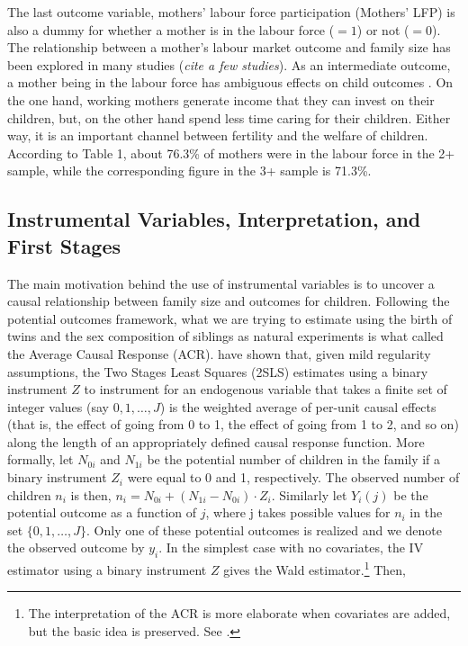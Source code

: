 The last outcome variable, mothers' labour force participation (Mothers' LFP) is also a dummy for whether a mother is in the labour force ($ =1 $) or not ($ =0 $). The relationship between a mother's labour market outcome and family size has been explored in many studies (\textit{cite a few studies}). As an intermediate outcome, a mother being in the labour force has ambiguous effects on child outcomes \parencite{caceres-delpiano_impacts_2006}. On the one hand, working mothers generate income that they can invest on their children, but, on the other hand spend less time caring for their children. Either way, it is an important channel between fertility and the welfare of children. According to Table 1, about 76.3\% of mothers were in the labour force in the 2+ sample, while the corresponding figure in the 3+ sample is 71.3\%.


\subsection{Instrumental Variables, Interpretation, and First Stages}

The main motivation behind the use of instrumental variables is to uncover a causal relationship between family size and outcomes for children. Following the potential outcomes framework, what we are trying to estimate using the birth of twins and the sex composition of siblings as natural experiments is what \textcite{Angrist1995} called the Average Causal Response (ACR). \textcite{Angrist1995} have shown that, given mild regularity assumptions, the Two Stages Least Squares (2SLS) estimates using a binary instrument $ Z $ to instrument for an endogenous variable that takes a finite set of integer values  (say $ 0, 1, \dots, J $) is the weighted average of per-unit causal effects (that is, the effect of going from 0 to 1, the effect of going from 1 to 2, and so on) along the length of an appropriately defined causal response function. More formally, let $ N_{0i} $ and $ N_{1i} $ be the potential number of children in the family if a binary instrument $ Z_{i} $ were equal to 0 and 1, respectively. The observed number of children $ n_{i} $ is then, $ n_{i} = N_{0i} + (N_{1i} - N_{0i})\cdot Z_{i} $. Similarly let $ Y_{i}(j) $ be the potential outcome as a function of $ j $, where j takes possible values for $ n_{i} $ in the set $ \{0, 1, \dots, J\} $. Only one of these potential outcomes is realized and we denote the observed outcome by $ y_{i} $. In the simplest case with no covariates, the IV estimator using a binary instrument $ Z $ gives the Wald estimator.\footnote{The interpretation of the ACR is more elaborate when covariates are added, but the basic idea is preserved. See \textcite[p.~437]{Angrist1995}.} Then,


